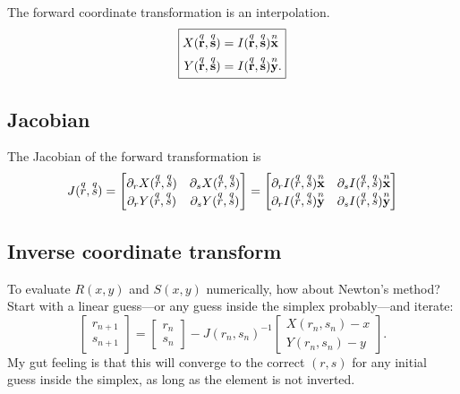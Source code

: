 The forward coordinate transformation is an interpolation.
%
\begin{equation}
\boxed{
\begin{aligned}
X(\q{\ve r}, \q{\ve s}) &= I(\q{\ve r}, \q{\ve s}) \n{\ve x} \\
Y(\q{\ve r}, \q{\ve s}) &= I(\q{\ve r}, \q{\ve s}) \n{\ve y}.
\end{aligned}
}%
\end{equation}

\subsection{Jacobian}
\label{sec:curvilinear_jacobian}

The Jacobian of the forward transformation is
%
\begin{equation}
J(\overset{q}{r}, \overset{q}{s}) =
\begin{bmatrix}
\partial_r X(\overset{q}{r}, \overset{q}{s}) & \partial_s X(\overset{q}{r}, \overset{q}{s}) \\
\partial_r Y(\overset{q}{r}, \overset{q}{s}) & \partial_s Y(\overset{q}{r}, \overset{q}{s})
\end{bmatrix}
=
\begin{bmatrix}
\partial_r I(\overset{q}{r}, \overset{q}{s}) \overset{n}{\textbf{x}} & \partial_s I(\overset{q}{r}, \overset{q}{s}) \overset{n}{\textbf{x}} \\
\partial_r I(\overset{q}{r}, \overset{q}{s}) \overset{n}{\textbf{y}} & \partial_s I(\overset{q}{r}, \overset{q}{s}) \overset{n}{\textbf{y}}
\end{bmatrix}
\end{equation}

\subsection{Inverse coordinate transform}

To evaluate $R(x,y)$ and $S(x,y)$ numerically, how about Newton's method?  Start with a linear guess---or any guess inside the simplex probably---and iterate:
%
\begin{equation}
\boxed{
\begin{bmatrix} r_{n+1} \\ s_{n+1} \end{bmatrix}
=
\begin{bmatrix} r_n \\ s_n \end{bmatrix}
-
J(r_n, s_n)^{-1}
\begin{bmatrix}X(r_n, s_n) - x \\ Y(r_n, s_n) - y \end{bmatrix}.
}%
\end{equation}
%
My gut feeling is that this will converge to the correct $(r,s)$ for any initial guess inside the simplex, as long as the element is not inverted.

